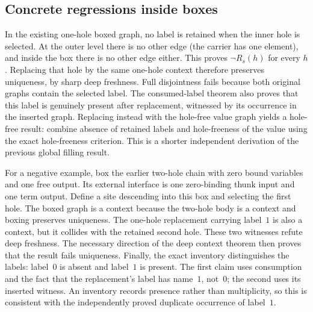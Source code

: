 \subsection{Concrete regressions inside boxes}

In the existing one-hole boxed graph, no label is retained when the inner hole
is selected. At the outer level there is no other edge (the carrier has one
element), and inside the box there is no other edge either. This proves
$\neg R_s(h)$ for every $h$.
Replacing that hole by the same one-hole context therefore preserves uniqueness,
by sharp deep freshness. Full disjointness fails because both original graphs
contain the selected label. The consumed-label theorem also proves that this
label is genuinely present after replacement, witnessed by its occurrence in
the inserted graph.
Replacing instead with the hole-free value graph yields a hole-free result:
combine absence of retained labels and hole-freeness of the value using the
exact hole-freeness criterion. This is a shorter independent derivation of the
previous global filling result.

For a negative example, box the earlier two-hole chain with zero bound variables
and one free output. Its external interface is one zero-binding thunk input and
one term output. Define a site descending into this box and selecting the first
hole. The boxed graph is a context because the two-hole body is a context and
boxing preserves uniqueness.
The one-hole replacement carrying label~$1$ is also a context, but it collides
with the retained second hole. These two witnesses refute deep freshness. The
necessary direction of the deep context theorem then proves that the result
fails uniqueness.
Finally, the exact inventory distinguishes the labels: label~$0$ is absent and
label~$1$ is present. The first claim uses consumption and the fact that the
replacement's label has name~$1$, not~$0$; the second uses its inserted witness.
An inventory records presence rather than multiplicity, so this is consistent
with the independently proved duplicate occurrence of label~$1$.
